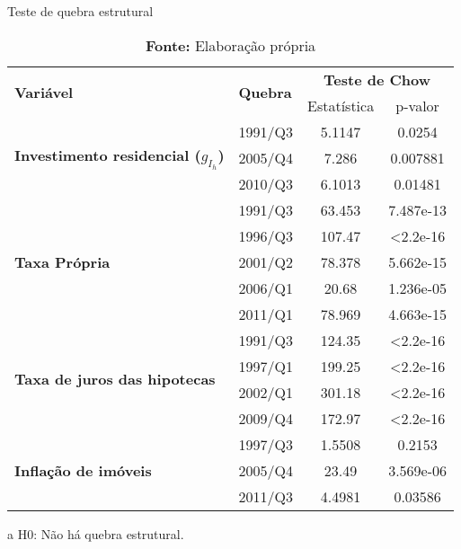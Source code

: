 \begin{table}[htb]
	\centering
	\caption{Teste de quebra estrutural}
	\label{structbreak}
	\begin{threeparttable}
		\begin{tabular}{l|l|cc}
			\hline \hline
			\multirow{2}{*}{\textbf{Variável}} & \multirow{2}{*}{\textbf{Quebra}} & \multicolumn{2}{c}{\textbf{Teste de Chow}\tnote{a}} \\ \cline{3-4} 
			&& Estatística & p-valor \\ \hline
			\multirow{3}{*}{\textbf{Investimento residencial ($g_{I_h}$)}} & 1991/Q3 & 5.1147 & 0.0254 \\
			& 2005/Q4 & 7.286 & 0.007881 \\
			& 2010/Q3 & 6.1013 & 0.01481 \\ \hline
			\multirow{5}{*}{\textbf{Taxa Própria}} & 1991/Q3 & 63.453 & 7.487e-13 \\
			& 1996/Q3 & 107.47 & \textless 2.2e-16 \\
			& 2001/Q2 & 78.378 & 5.662e-15 \\
			& 2006/Q1 & 20.68 & 1.236e-05 \\
			& 2011/Q1 & 78.969 & 4.663e-15 \\ \hline
			\multirow{4}{*}{\textbf{Taxa de juros das hipotecas}} & 1991/Q3 & 124.35 & \textless 2.2e-16 \\
			& 1997/Q1 & 199.25 & \textless 2.2e-16 \\
			& 2002/Q1 & 301.18 & \textless 2.2e-16 \\
			& 2009/Q4 & 172.97 & \textless 2.2e-16 \\ \hline
			\multirow{3}{*}{\textbf{Inflação de imóveis}} & 1997/Q3 & 1.5508 & 0.2153 \\
			& 2005/Q4 & 23.49 & 3.569e-06 \\
			& 2011/Q3 & 4.4981 & 0.03586 \\ 
			\hline \hline
		\end{tabular}%
	\begin{tablenotes}\footnotesize
		\item [a] H0: Não há quebra estrutural.
	\end{tablenotes}
\end{threeparttable}
	\caption*{\textbf{Fonte:} Elaboração própria}
\end{table}
